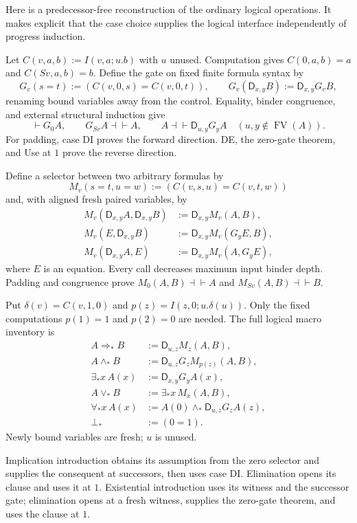\documentclass[11pt]{article}
\theoremstyle{definition}\newtheorem{definition}[theorem]{Definition}
\begin{document}
Here is a predecessor-free reconstruction of the ordinary logical
operations. It makes explicit that the case choice supplies the
logical interface independently of progress induction.

Let $C(v,a,b):=I(v,a;u.b)$ with $u$ unused. Computation gives
$C(0,a,b)=a$ and $C(Sv,a,b)=b$. Define the gate on fixed finite
formula syntax by
\[
 G_v(s=t):=(C(v,0,s)=C(v,0,t)),\qquad
 G_v(\mathsf D_{x,y}B):=\mathsf D_{x,y}G_vB,
\]
renaming bound variables away from the control. Equality,
binder congruence, and external structural induction give
\[
 \vdash G_0A,\qquad G_{Sv}A\dashv\vdash A,\qquad
 A\dashv\vdash\mathsf D_{u,y}G_yA
 \quad(u,y\notin\operatorname{FV}(A)).
\tag{Gate and padding}\label{eq:choice-gate}
\]
For padding, case DI proves the forward direction. DE, the
zero-gate theorem, and Use at $1$ prove the reverse direction.

Define a selector between two arbitrary formulas by
\[
 M_v(s=t,u=w):=(C(v,s,u)=C(v,t,w))
\]
and, with aligned fresh paired variables, by
\[
\begin{aligned}
 M_v(\mathsf D_{x,y}A,\mathsf D_{x,y}B)
   &:=\mathsf D_{x,y}M_v(A,B),\\
 M_v(E,\mathsf D_{x,y}B)
   &:=\mathsf D_{x,y}M_v(G_yE,B),\\
 M_v(\mathsf D_{x,y}A,E)
   &:=\mathsf D_{x,y}M_v(A,G_yE),
\end{aligned}
\]
where $E$ is an equation. Every call decreases maximum input
binder depth. Padding and congruence prove
$M_0(A,B)\dashv\vdash A$ and
$M_{Sv}(A,B)\dashv\vdash B$.

Put $\delta(v)=C(v,1,0)$ and $p(z)=I(z,0;u.\delta(u))$.
Only the fixed computations $p(1)=1$ and $p(2)=0$ are needed.
The full logical macro inventory is
\[
\begin{aligned}
 A\Rightarrow_*B&:=\mathsf D_{u,z}M_z(A,B),\\
 A\wedge_*B&:=\mathsf D_{u,z}G_zM_{p(z)}(A,B),\\
 \exists_*x\,A(x)&:=\mathsf D_{x,y}G_yA(x),\\
 A\vee_*B&:=\exists_*x\,M_x(A,B),\\
 \forall_*x\,A(x)&:=
        A(0)\wedge_*\mathsf D_{u,z}G_zA(z),\\
 \bot_*&:=(0=1).
\end{aligned}
\tag{Logical macros}\label{eq:choice-macros}
\]
Newly bound variables are fresh; $u$ is unused.

Implication introduction obtains its assumption from the zero
selector and supplies the consequent at successors, then uses
case DI. Elimination opens its clause and uses it at $1$.
Existential introduction uses its witness and the successor
gate; elimination opens at a fresh witness, supplies the
zero-gate theorem, and uses the clause at $1$.
\end{document}
